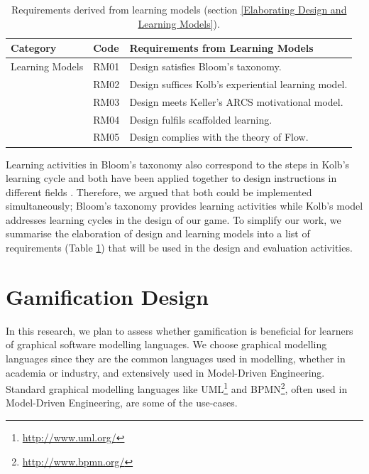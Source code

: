 \documentclass[12pt, a4paper]{report}
\begin{document}
\begin{table}[ht]
\caption{Requirements derived from learning models (section \ref{Elaborating Design and Learning Models}).}
\label{design-learning-models}
\begin{center}
\begin{tabular}{ p{2cm}p{1cm}p{10cm} } 
\hline
Category & Code & Requirements from Learning Models \\
\hline
\multirow{1}{2cm}{Learning Models} 
& RM01 & Design satisfies Bloom's taxonomy. \\
& RM02 & Design suffices Kolb's experiential learning model. \\ 
& RM03 & Design meets Keller's ARCS motivational model. \\
& RM04 & Design fulfils scaffolded learning. \\
& RM05 & Design complies with the theory of Flow. \\ 
\hline
\end{tabular}
\end{center}
\end{table}

Learning activities in Bloom's taxonomy also correspond to the steps in Kolb's learning cycle \cite{murphy2007prior} and both have been applied together to design instructions in different fields \cite{terry1993kolb, howard1996felder, schatzberg2002applying}. Therefore, we argued that both could be implemented simultaneously; Bloom's taxonomy provides learning activities while Kolb's model addresses learning cycles in the design of our game. To simplify our work, we summarise the elaboration of design and learning models into a list of requirements (Table \ref{design-learning-models}) that will be used in the design and evaluation activities.

\section{Gamification Design}
\label{Gamification Design}
In this research, we plan to assess whether gamification is beneficial for learners of graphical software modelling languages. We choose graphical modelling languages since they are the common languages used in modelling, whether in academia or industry, and extensively used in Model-Driven Engineering. Standard graphical modelling languages like UML\footnote{\url{http://www.uml.org/}} and BPMN\footnote{\url{http://www.bpmn.org/}}, often used in Model-Driven Engineering, are some of the use-cases.        
\end{document}
